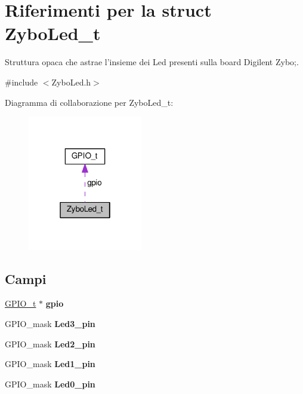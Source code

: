 \hypertarget{struct_zybo_led__t}{\section{Riferimenti per la struct Zybo\+Led\+\_\+t}
\label{struct_zybo_led__t}
}


Struttura opaca che astrae l'insieme dei Led presenti sulla board Digilent Zybo;.  




{\ttfamily \#include $<$Zybo\+Led.\+h$>$}



Diagramma di collaborazione per Zybo\+Led\+\_\+t\+:
\nopagebreak
\begin{figure}[H]
\begin{center}
\leavevmode
\includegraphics[width=142pt]{struct_zybo_led__t__coll__graph}
\end{center}
\end{figure}
\subsection*{Campi}
\begin{DoxyCompactItemize}
\item 
\hypertarget{struct_zybo_led__t_acb3116190992a4d8d26545c103304d27}{\hyperlink{struct_g_p_i_o__t}{G\+P\+I\+O\+\_\+t} $\ast$ {\bfseries gpio}}\label{struct_zybo_led__t_acb3116190992a4d8d26545c103304d27}

\item 
\hypertarget{struct_zybo_led__t_a85b108a2f134972366da967a9489068f}{G\+P\+I\+O\+\_\+mask {\bfseries Led3\+\_\+pin}}\label{struct_zybo_led__t_a85b108a2f134972366da967a9489068f}

\item 
\hypertarget{struct_zybo_led__t_a566ca7784af030de3be9244c99066a5c}{G\+P\+I\+O\+\_\+mask {\bfseries Led2\+\_\+pin}}\label{struct_zybo_led__t_a566ca7784af030de3be9244c99066a5c}

\item 
\hypertarget{struct_zybo_led__t_a2ee8b92c08972eb1b5bb1b72f4a9d305}{G\+P\+I\+O\+\_\+mask {\bfseries Led1\+\_\+pin}}\label{struct_zybo_led__t_a2ee8b92c08972eb1b5bb1b72f4a9d305}

\item 
\hypertarget{struct_zybo_led__t_aa4d077e557e43132a3100ab30b60165c}{G\+P\+I\+O\+\_\+mask {\bfseries Led0\+\_\+pin}}\label{struct_zybo_led__t_aa4d077e557e43132a3100ab30b60165c}

\end{DoxyCompactItemize}


